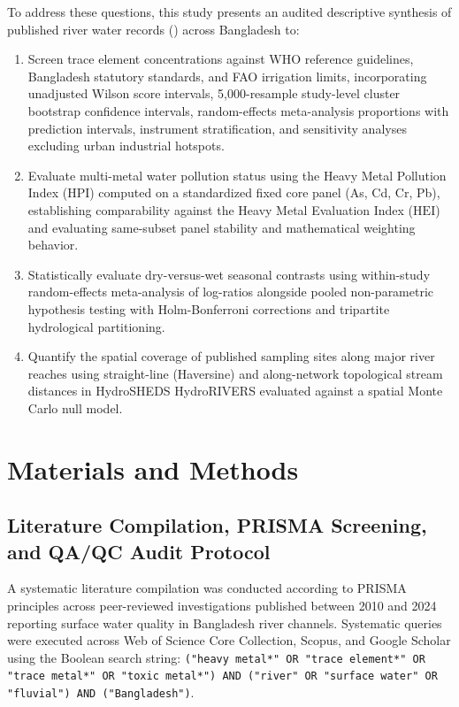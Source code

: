 \documentclass[authoryear,preprint,12pt]{elsarticle}
\begin{document}
To address these questions, this study presents an audited descriptive synthesis of published river water records (\StudyWindowYears) across Bangladesh to:
\begin{enumerate}
    \item Screen trace element concentrations against WHO reference guidelines, Bangladesh statutory standards, and FAO irrigation limits, incorporating unadjusted Wilson score intervals, 5,000-resample study-level cluster bootstrap confidence intervals, random-effects meta-analysis proportions with prediction intervals, instrument stratification, and sensitivity analyses excluding urban industrial hotspots.
    \item Evaluate multi-metal water pollution status using the Heavy Metal Pollution Index ($\mathrm{HPI}$) computed on a standardized fixed core panel (As, Cd, Cr, Pb), establishing comparability against the Heavy Metal Evaluation Index ($\mathrm{HEI}$) and evaluating same-subset panel stability and mathematical weighting behavior.
    \item Statistically evaluate dry-versus-wet seasonal contrasts using within-study random-effects meta-analysis of log-ratios alongside pooled non-parametric hypothesis testing with Holm-Bonferroni corrections and tripartite hydrological partitioning.
    \item Quantify the spatial coverage of published sampling sites along major river reaches using straight-line (Haversine) and along-network topological stream distances in HydroSHEDS HydroRIVERS evaluated against a spatial Monte Carlo null model.
\end{enumerate}

\section{Materials and Methods}

\subsection{Literature Compilation, PRISMA Screening, and QA/QC Audit Protocol}
A systematic literature compilation was conducted according to PRISMA principles across peer-reviewed investigations published between 2010 and 2024 reporting surface water quality in Bangladesh river channels. Systematic queries were executed across Web of Science Core Collection, Scopus, and Google Scholar using the Boolean search string: \texttt{("heavy metal*" OR "trace element*" OR "trace metal*" OR "toxic metal*") AND ("river" OR "surface water" OR "fluvial") AND ("Bangladesh")}. 
\end{document}
